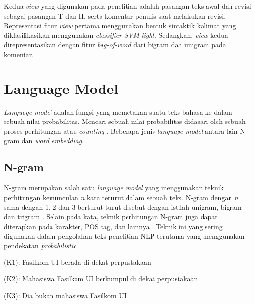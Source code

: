 	Kedua \textit{view} yang digunakan pada penelitian \cite{zanzottoRTEexpand} adalah pasangan teks awal dan revisi sebagai pasangan T dan H, serta komentar penulis saat melakukan revisi. Representasi fitur \textit{view} pertama  menggunakan bentuk sintaktik kalimat yang diklasifikasikan menggunakan \textit{classifier SVM-light}. Sedangkan, \textit{view} kedua direpresentasikan dengan fitur \textit{bag-of-word} dari bigram dan unigram pada komentar.
	
	
\section{Language Model}
\textit{Language model} adalah fungsi yang memetakan suatu teks bahasa ke dalam sebuah nilai probabilitas\citep{Manning:2008:IIR:1394399}. Mencari sebuah nilai probabilitas didasari oleh sebuah proses perhitungan atau \textit{counting} \citep{jurafsky2014speech}. Beberapa jenis \textit{language model} antara lain N-gram dan \textit{word embedding}.


	\subsection{N-gram}
	N-gram merupakan salah satu \textit{language model} yang menggunakan teknik perhitungan kemunculan \textit{n} kata terurut dalam sebuah teks. N-gram dengan \textit{n} sama dengan 1, 2 dan 3 berturut-turut disebut dengan istilah unigram, bigram dan trigram \citep{jurafsky2014speech}. Selain pada kata, teknik perhitungan N-gram juga dapat diterapkan pada karakter, POS tag, dan lainnya \citep{Sidorov:2014:SNM:2538034.2538087}. Teknik ini yang sering digunakan dalam pengolahan teks penelitian NLP terutama yang menggunakan pendekatan \textit{probabilistic}.
	
	(K1): Fasilkom UI berada di dekat perpustakaan
	
	(K2): Mahasiswa Fasilkom UI berkumpul di dekat perpustakaan
	
	(K3): Dia bukan mahasiswa Fasilkom UI
	
